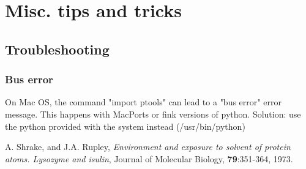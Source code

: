 \documentclass[12pt,a4paper]{article}
\begin{document}
\section{Misc. tips and tricks}


\subsection{Troubleshooting}

\subsubsection{Bus error}
On Mac OS, the command "import ptools" can lead to a "bus error" error message. This happens with MacPorts or 
fink versions of python. Solution: use the python provided with the system instead (/usr/bin/python)



\begin{thebibliography}{99}

 A. Shrake, and J.A. Rupley, 
{\it Environment and exposure to solvent of protein atoms. Lysozyme and
isulin}, 
Journal of Molecular Biology, {\bf 79}:351-364, 1973.

\end{thebibliography}
\end{document}
